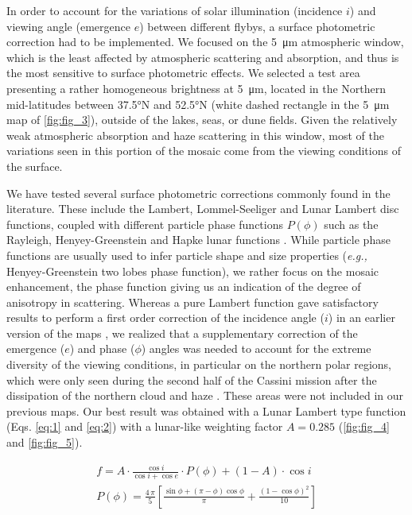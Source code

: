 \documentclass[preprint,twocolumn,5p,authoryear,compress,colorlinks=true]{elsarticle}
\newcommand{\figref}[1]{\autoref{fig:#1}}
\begin{document}
{In order to account for the variations of solar illumination (incidence $i$) and viewing angle (emergence $e$) between different flybys, a surface photometric correction had to be implemented. We focused on the \SI{5}{\um} atmospheric window, which is the least affected by atmospheric scattering and absorption, and thus is the most sensitive to surface photometric effects. We selected a test area presenting a rather homogeneous brightness at \SI{5}{\um}, located in the Northern mid-latitudes between \ang{37.5}N and \ang{52.5}N (white dashed rectangle in the \SI{5}{\um} map of \figref{fig_3}), outside of the lakes, seas, or dune fields. Given the relatively weak atmospheric absorption and haze scattering in this window, most of the variations seen in this portion of the mosaic come from the viewing conditions of the surface.

We have tested several surface photometric corrections commonly found in the literature. These include the Lambert, Lommel-Seeliger and Lunar Lambert disc functions, coupled with different particle phase functions $P(\phi)$ such as the Rayleigh, Henyey-Greenstein and Hapke lunar functions \cite{Hapke2012}. While particle phase functions are usually used to infer particle shape and size properties (\emph{e.g.,} Henyey-Greenstein two lobes phase function), we rather focus on the mosaic enhancement, the phase function giving us an indication of the degree of anisotropy in scattering.
Whereas a pure Lambert function gave satisfactory results to perform a first order correction of the incidence angle ($i$) in an earlier version of the maps \citep{LeMouelic2012a}, we realized that a supplementary correction of the emergence ($e$) and phase ($\phi$) angles was needed to account for the extreme diversity of the viewing conditions, in particular on the northern polar regions, which were only seen during the second half of the Cassini mission after the dissipation of the northern cloud and haze \citep{LeMouelic2012b, LeMouelic2018}.
These areas were not included in our previous maps. Our best result was obtained with a Lunar Lambert type function (Eqs. \eqref{eq:1} and \eqref{eq:2}) with a lunar-like weighting factor $A = 0.285$ (\figref{fig_4} and \ref{fig:fig_5}).

\begin{align}
\label{eq:1}
    f = A \cdot \frac{\cos i}{\cos i + \cos e} \cdot P(\phi) + \left(1 - A \right) \cdot \cos i \\
\label{eq:2}
    P(\phi) = \frac{4\, \pi}{5} \left[ 
        \frac{\sin\phi + (\pi - \phi) \cos\phi}{\pi} +
        \frac{\left(1 - \cos\phi\right)^2}{10}
    \right]
\end{align}

}
\end{document}

